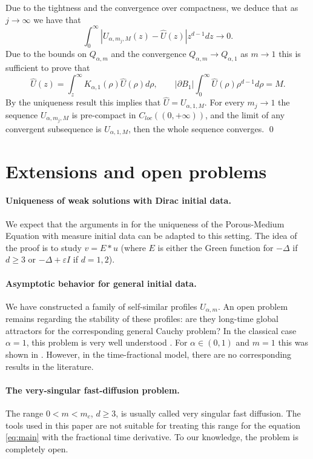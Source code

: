 \documentclass[a4paper]{article}
\theoremstyle{definition}
\begin{document}
Due to the tightness and the convergence over compactness, we deduce that as $j \to \infty$ we have that
\[
\int_0^\infty |U_{\alpha,m_j,M}(z) - \widehat U(z)| z^{d-1} dz \to 0.
\]
Due to the bounds on $Q_{\alpha,m}$ and the convergence $Q_{\alpha,m} \to Q_{\alpha, 1}$ as $m \to 1$ this is sufficient to prove that
\begin{equation*}
\widehat U(z) = \int_z^\infty K_{\alpha,1}(\rho) \widehat U(\rho) d \rho , \qquad |\partial B_1| \int_0^\infty \widehat U(\rho) \rho^{d-1} d \rho = M.
\end{equation*}
By the uniqueness result  this implies that $\widehat U = U_{\alpha,1,M}.$
For every $m_j \to 1$ the sequence $U_{\alpha,m_j,M}$ is pre-compact in $C_{loc}((0,+\infty))$, and the limit of any convergent subsequence is $U_{\alpha,1,M}$, then the whole sequence converges.
\qed

\section{Extensions and open problems}

\paragraph{Uniqueness of weak solutions with Dirac initial data.}
We expect that the arguments in \cite{Pierre1982} for the uniqueness of the Porous-Medium Equation with measure initial data can be adapted to this setting. The idea of the proof is to study $v = E * u$ (where $E$ is either the Green function for $-\Delta$ if $d \ge 3$ or $-\Delta + \varepsilon I$ if $d =1,2$).

\paragraph{Asymptotic behavior for general initial data.}
We have constructed a family of self-similar profiles $U_{\alpha,m}$. 
An open problem remains regarding the stability of these profiles: are they long-time global attractors for the corresponding general Cauchy problem? In the classical case $\alpha=1$, this problem is very well understood \cite{vazquez2014barenblatt}. 
For $\alpha \in (0,1)$ and $m = 1$ this was shown in \cite{cortazarHeatEquationMemory2021}.
However, in the time-fractional model, there are no corresponding results in the literature. 

\paragraph{The very-singular fast-diffusion problem.}
The range $0<m<m_c$, $d\ge 3$, is usually called very singular fast diffusion. The tools used in this paper are not suitable for treating this range for the equation \eqref{eq:main} with the fractional time derivative. To our knowledge, the problem is completely open.
\end{document}
